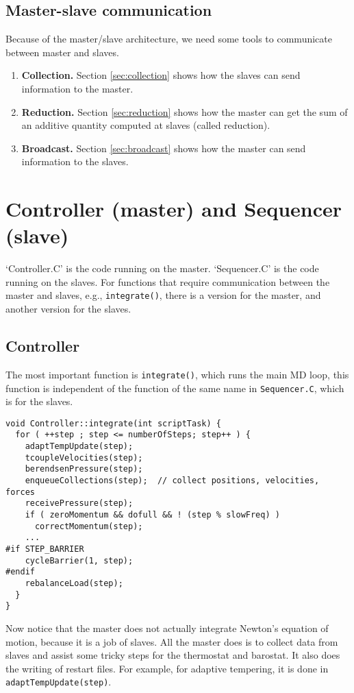 \documentclass{article}
\begin{document}
\subsection{Master-slave communication}

Because of the master/slave architecture,
we need some tools to communicate between master and slaves.
%
\begin{enumerate}
  \item \textbf{Collection.}
    Section \ref{sec:collection} shows how the slaves
    can send information to the master.

  \item \textbf{Reduction.}
    Section \ref{sec:reduction} shows how the master
    can get the sum of an additive quantity
    computed at slaves (called reduction).

  \item \textbf{Broadcast.}
    Section \ref{sec:broadcast} shows how the master
    can send information to the slaves.
\end{enumerate}
%


\section{Controller (master) and Sequencer (slave)}

`Controller.C' is the code running on the master.
`Sequencer.C' is the code running on the slaves.
For functions that require communication between
the master and slaves, e.g., \texttt{integrate()},
there is a version for the master,
and another version for the slaves.

\subsection{Controller}

The most important function is \texttt{integrate()},
which runs the main MD loop,
this function is independent of the function of the same name
in \texttt{Sequencer.C},
which is for the slaves.

\begin{lstlisting}
void Controller::integrate(int scriptTask) {
  for ( ++step ; step <= numberOfSteps; step++ ) {
    adaptTempUpdate(step);
    tcoupleVelocities(step);
    berendsenPressure(step);
    enqueueCollections(step);  // collect positions, velocities, forces
    receivePressure(step);
    if ( zeroMomentum && dofull && ! (step % slowFreq) )
      correctMomentum(step);
    ...
#if STEP_BARRIER
    cycleBarrier(1, step);
#endif
    rebalanceLoad(step);
  }
}
\end{lstlisting}
%
Now notice that the master does not actually
integrate Newton's equation of motion,
because it is a job of slaves.
%
All the master does is to collect data from slaves
and assist some tricky steps for the thermostat and barostat.
%
It also does the writing of restart files.
%
For example, for adaptive tempering,
it is done in \texttt{adaptTempUpdate(step)}.
\end{document}
